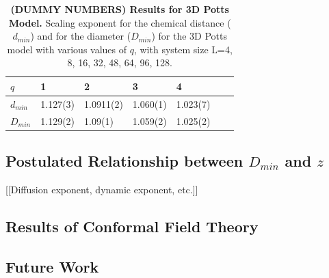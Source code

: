 \documentclass[aps, preprint, groupedaddress]{revtex4}
\begin{document}
\begin{table}[h]
\begin{center}
\begin{tabular}{| l | l | l | l | l | l | l |}
\hline
$q$ & 1 & 2 & 3 & 4 \\
\hline
$d_{min}$ & 1.127(3) & 1.0911(2) & 1.060(1) & 1.023(7) \\
\hline
$D_{min}$ & 1.129(2) & 1.09(1) & 1.059(2) & 1.025(2) \\
\hline
\end{tabular}
\caption{\label{tab:dminD3d} {\bf (DUMMY NUMBERS) Results for 3D Potts Model.} Scaling exponent for the chemical distance ($d_{min}$) and for the diameter ($D_{min}$) for the 3D Potts model with various values of $q$, with system size L=4, 8, 16, 32, 48, 64, 96, 128.}
\end{center}
\end{table}

\subsection{Postulated Relationship between $D_{min}$ and $z$}

[[Diffusion exponent, dynamic exponent, etc.]]

\subsection{Results of Conformal Field Theory}

\subsection{Future Work}
\end{document}
